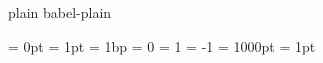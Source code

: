 \ifnocontextobject \donetrue \do \newif\ifdone \fi


\def\!!stringa{plain}       \ifx\!!stringa\fmtname \donetrue  \else
\def\!!stringa{babel-plain} \ifx\!!stringa\fmtname \donetrue  \else
                                                   \donefalse \fi \fi

\ifdone
  \newdimen\scratchdimen %
  \newdimen\scratchdimen %
  \newdimen\scratchdimen %
  \newdimen\scratchdimen %
  \newdimen\scratchdimen %
  \newdimen\scratchdimen %
\fi

\ifnocontextobject \scratchcounter \do \newcount  \scratchcounter \fi
\ifnocontextobject \scratchtoks    \do \newtoks   \scratchtoks    \fi
\ifnocontextobject \scratchdimen   \do \newdimen  \scratchdimen   \fi
\ifnocontextobject \scratchskip    \do \newskip   \scratchskip    \fi
\ifnocontextobject \scratchmuskip  \do \newmuskip \scratchmuskip  \fi
\ifnocontextobject \scratchbox     \do \newbox    \scratchbox     \fi
\ifnocontextobject \scratchread    \do \newread   \scratchread    \fi
\ifnocontextobject \scratchwrite   \do \newwrite  \scratchwrite   \fi


\ifnocontextobject \zeropoint      \do \newdimen  \zeropoint      \zeropoint     =    0pt \fi %
\ifnocontextobject \onepoint       \do \newdimen  \onepoint       \onepoint      =    1pt \fi
\ifnocontextobject \onebasepoint   \do \newdimen  \onebasepoint   \onebasepoint  =    1bp \fi
\ifnocontextobject \zerocount      \do \chardef   \zerocount                     =      0 \fi
\ifnocontextobject \plusone        \do \chardef   \plusone                       =      1 \fi
\ifnocontextobject \minusone       \do \newcount  \minusone       \minusone      =     -1 \fi
\ifnocontextobject \thousandpoint  \do \newdimen  \thousandpoint  \thousandpoint = 1000pt \fi
\ifnocontextobject \onerealpoint   \do \newdimen  \onerealpoint   \onerealpoint  =    1pt \fi %


